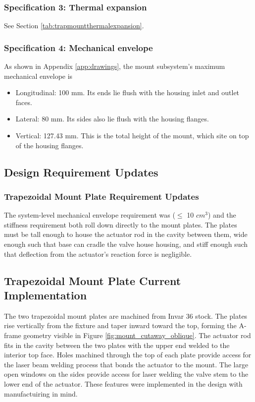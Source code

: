 \documentclass[12pt, letterpaper]{report}%
\newcounter{mycounter}           %
\newcounter{sub}[mycounter]      %
\begin{document}
        \subsubsection{Specification 3: Thermal expansion}
        \label{subsec:mount_spec_3}

        See Section \ref{tab:trapmountthermalexpansion}.

        \subsubsection{Specification 4: Mechanical envelope}
        \label{subsec:mount_spec_4}

            As shown in Appendix \ref{app:drawings}, the mount subsystem's maximum mechanical envelope is
            \begin{itemize}
                \item Longitudinal: 100 mm. Its ends lie flush with the housing inlet and outlet faces.
                \item Lateral: 80 mm. Its sides also lie flush with the housing flanges.
                \item Vertical: 127.43 mm. This is the total height of the mount, which site on top of the housing flanges.
            \end{itemize}


       
        \subsection{Design Requirement Updates}
        \subsubsection{Trapezoidal Mount Plate Requirement Updates}
            The system-level mechanical envelope requirement was ($\leq$ 10 $cm^3$) and the stiffness requirement both roll down directly to the mount plates. The plates must be tall enough to house the actuator rod in the cavity between them, wide enough such that base can cradle the valve house housing,
            and stiff enough such that deflection from the actuator's reaction force is negligible. 

        \subsection{Trapezoidal Mount Plate Current Implementation}
            The two trapezoidal mount plates are machined from Invar 36 stock. The plates rise vertically from the fixture and taper inward toward the top, forming the A-frame geometry visible in Figure \ref{fig:mount_cutaway_oblique}. The actuator rod fits in the cavity between the two plates with the upper end welded to the interior
            top face. Holes machined through the top of each plate provide access for the laser beam welding process that bonds the actuator to the mount. The large open windows on the sides provide access for laser welding the valve stem to the lower end of the actuator. These features were implemented in the design with manufactuiring in mind.
            
\end{document}
